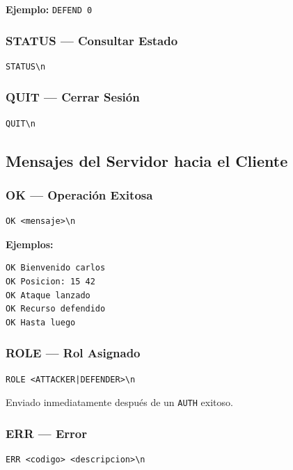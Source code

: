 \documentclass[12pt, letterpaper]{article}
\begin{document}
\textbf{Ejemplo:} \texttt{DEFEND 0}

\subsubsection{STATUS --- Consultar Estado}

\begin{lstlisting}
STATUS\n
\end{lstlisting}

\subsubsection{QUIT --- Cerrar Sesión}

\begin{lstlisting}
QUIT\n
\end{lstlisting}

\subsection{Mensajes del Servidor hacia el Cliente}

\subsubsection{OK --- Operación Exitosa}

\begin{lstlisting}
OK <mensaje>\n
\end{lstlisting}

\textbf{Ejemplos:}
\begin{lstlisting}
OK Bienvenido carlos
OK Posicion: 15 42
OK Ataque lanzado
OK Recurso defendido
OK Hasta luego
\end{lstlisting}

\subsubsection{ROLE --- Rol Asignado}

\begin{lstlisting}
ROLE <ATTACKER|DEFENDER>\n
\end{lstlisting}

Enviado inmediatamente después de un \texttt{AUTH} exitoso.

\subsubsection{ERR --- Error}

\begin{lstlisting}
ERR <codigo> <descripcion>\n
\end{lstlisting}
\end{document}
